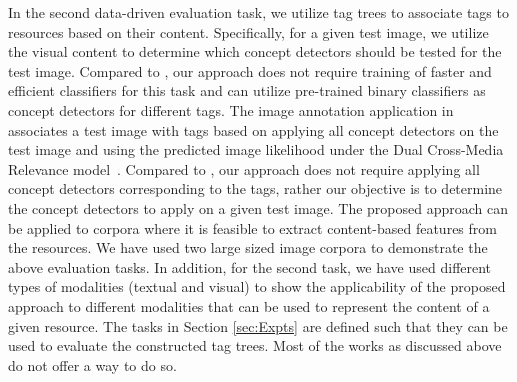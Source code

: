 {{{\indent In the second data-driven evaluation task, we utilize tag trees to associate tags to resources based on their content. Specifically, for a given test image, we utilize the visual content to determine which concept detectors should be tested for the test image. Compared to {\cite{li2013classifying}}, our approach does not require training of faster and efficient classifiers for this task and can utilize pre-trained binary classifiers as concept detectors for different tags. The image annotation application in {\cite{wu2008flickr}} associates a test image with tags based on applying all concept detectors on the test image and using the predicted image likelihood under the Dual Cross-Media Relevance model~{\cite{liu2007dual}}. Compared to {\cite{wu2008flickr}}, our approach does not require applying all concept detectors corresponding to the tags, rather our objective is to determine the concept detectors to apply on a given test image. The proposed approach can be applied to corpora where it is feasible to extract content-based features from the resources. We have used two large sized image corpora to demonstrate the above evaluation tasks. In addition, for the second task, we have used different types of modalities (textual and visual) to show the applicability of the proposed approach to different modalities that can be used to represent the content of a given resource. The tasks in Section {\ref{sec:Expts}} are defined such that they can be used to evaluate the constructed tag trees. Most of the works as discussed above do not offer a way to do so. \\
}
}}
